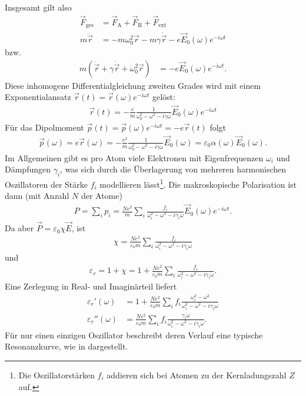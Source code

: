 Insgesamt gilt also
\begin{align*}
    \vec F_\mathrm{ges} & =\vec F_\mathrm{A} + \vec F_\mathrm{R} + \vec F_\mathrm{ext}               \\
    m\ddot{\vec r}      & = -m\omega_0^2 \vec r-m\gamma\dot{\vec r} -e\vec E_0(\omega)e^{-i\omega t}
\end{align*}
bzw.
\begin{align*}
    m\left(\ddot{\vec r}+\gamma\dot{\vec r} +\omega_0^2 \vec r\right) & = -e\vec E_0(\omega)e^{-i\omega t}.
\end{align*}
Diese inhomogene Differentialgleichung zweiten Grades wird mit einem Exponentialansatz $\vec r(t)=\vec r(\omega)e^{-i\omega t}$ gelöst:
\begin{align*}
    \vec r(t) = -\frac{e}{m} \frac{1}{\omega_0^2-\omega^2-i\gamma\omega} \vec E_0(\omega)e^{-i\omega t}
\end{align*}
Für das Dipolmoment $\vec p(t)=\vec p(\omega)e^{-i\omega t} = -e\vec r(t)$ folgt
\begin{align*}
    \vec p(\omega) = e\vec r(\omega)= -\frac{e^2}{m} \frac{1}{\omega_0^2-\omega^2-i\gamma\omega} \vec E_0(\omega) = \varepsilon_0 \alpha(\omega)\vec E_0(\omega).
\end{align*}
Im Allgemeinen gibt es pro Atom viele Elektronen mit Eigenfrequenzen $\omega_i$ und Dämpfungen $\gamma_i$, was sich durch die Überlagerung von mehreren harmonischen Oszillatoren der Stärke $f_i$ modellieren lässt\footnote{Die Oszillatorstärken $f_i$ addieren sich bei Atomen zu der Kernladungszahl $Z$ auf.}.
Die makroskopische Polarisation ist dann (mit Anzahl $N$ der Atome)
\begin{align*}
    P = \sum_i p_i = \frac{Ne^2}{m}\sum_i  \frac{f_i}{\omega_i^2-\omega^2-i\gamma_i\omega} \vec E_0(\omega)e^{-i\omega t}.
\end{align*}
Da aber $\vec P=\varepsilon_0 \chi \vec E$, ist
\begin{align*}
    \chi = \frac{Ne^2}{\varepsilon_0 m} \sum_i \frac{f_i}{\omega_i^2-\omega^2-i\gamma_i\omega}
\end{align*}
und
\begin{align*}
    \varepsilon_r = 1+\chi = 1+ \frac{Ne^2}{\varepsilon_0 m} \sum_i \frac{f_i}{\omega_i^2-\omega^2-i\gamma_i\omega}.
\end{align*}
Eine Zerlegung in Real- und Imaginärteil liefert
\begin{align*}
    \varepsilon_r'(\omega)  & = 1 + \frac{Ne^2}{\varepsilon_0 m} \sum_i f_i\frac{\omega_i^2-\omega^2}{\omega_i^2-\omega^2-i\gamma_i\omega} \\
    \varepsilon_r''(\omega) & = \frac{Ne^2}{\varepsilon_0 m} \sum_i f_i\frac{ \gamma_i\omega}{\omega_i^2-\omega^2-i\gamma_i\omega} .
\end{align*}
Für nur einen einzigen Oszillator beschreibt deren Verlauf eine typische Resonanzkurve, wie in  dargestellt. 


